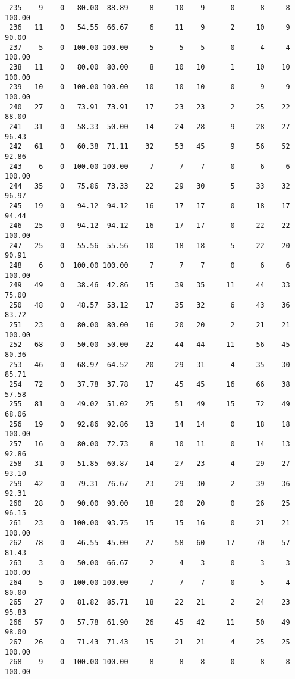 \begin{verbatim}
 235    9    0   80.00  88.89     8     10    9      0      8     8   100.00
 236   11    0   54.55  66.67     6     11    9      2     10     9    90.00
 237    5    0  100.00 100.00     5      5    5      0      4     4   100.00
 238   11    0   80.00  80.00     8     10   10      1     10    10   100.00
 239   10    0  100.00 100.00    10     10   10      0      9     9   100.00
 240   27    0   73.91  73.91    17     23   23      2     25    22    88.00
 241   31    0   58.33  50.00    14     24   28      9     28    27    96.43
 242   61    0   60.38  71.11    32     53   45      9     56    52    92.86
 243    6    0  100.00 100.00     7      7    7      0      6     6   100.00
 244   35    0   75.86  73.33    22     29   30      5     33    32    96.97
 245   19    0   94.12  94.12    16     17   17      0     18    17    94.44
 246   25    0   94.12  94.12    16     17   17      0     22    22   100.00
 247   25    0   55.56  55.56    10     18   18      5     22    20    90.91
 248    6    0  100.00 100.00     7      7    7      0      6     6   100.00
 249   49    0   38.46  42.86    15     39   35     11     44    33    75.00
 250   48    0   48.57  53.12    17     35   32      6     43    36    83.72
 251   23    0   80.00  80.00    16     20   20      2     21    21   100.00
 252   68    0   50.00  50.00    22     44   44     11     56    45    80.36
 253   46    0   68.97  64.52    20     29   31      4     35    30    85.71
 254   72    0   37.78  37.78    17     45   45     16     66    38    57.58
 255   81    0   49.02  51.02    25     51   49     15     72    49    68.06
 256   19    0   92.86  92.86    13     14   14      0     18    18   100.00
 257   16    0   80.00  72.73     8     10   11      0     14    13    92.86
 258   31    0   51.85  60.87    14     27   23      4     29    27    93.10
 259   42    0   79.31  76.67    23     29   30      2     39    36    92.31
 260   28    0   90.00  90.00    18     20   20      0     26    25    96.15
 261   23    0  100.00  93.75    15     15   16      0     21    21   100.00
 262   78    0   46.55  45.00    27     58   60     17     70    57    81.43
 263    3    0   50.00  66.67     2      4    3      0      3     3   100.00
 264    5    0  100.00 100.00     7      7    7      0      5     4    80.00
 265   27    0   81.82  85.71    18     22   21      2     24    23    95.83
 266   57    0   57.78  61.90    26     45   42     11     50    49    98.00
 267   26    0   71.43  71.43    15     21   21      4     25    25   100.00
 268    9    0  100.00 100.00     8      8    8      0      8     8   100.00

\end{verbatim}
